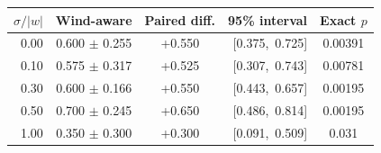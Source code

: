 \begin{tabular}{rccrc}
\toprule
$\sigma/|w|$ & Wind-aware & Paired diff. & 95\% interval & Exact $p$ \\
\midrule
0.00 & 0.600 $\pm$ 0.255 & +0.550 & [0.375,\, 0.725] & 0.00391 \\
0.10 & 0.575 $\pm$ 0.317 & +0.525 & [0.307,\, 0.743] & 0.00781 \\
0.30 & 0.600 $\pm$ 0.166 & +0.550 & [0.443,\, 0.657] & 0.00195 \\
0.50 & 0.700 $\pm$ 0.245 & +0.650 & [0.486,\, 0.814] & 0.00195 \\
1.00 & 0.350 $\pm$ 0.300 & +0.300 & [0.091,\, 0.509] & 0.031 \\
\bottomrule
\end{tabular}
